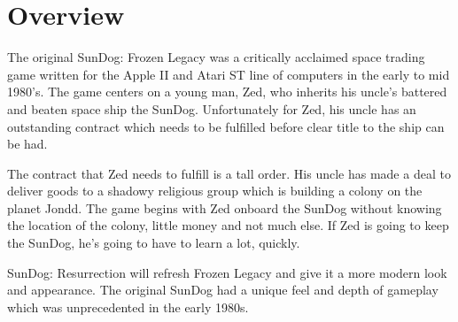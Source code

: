 \section{Overview}

The original SunDog: Frozen Legacy was a critically acclaimed space trading
game written for the Apple II and Atari ST line of computers in the early
to mid 1980's.  The game centers on a young man, Zed, who inherits his
uncle's battered and beaten space ship the SunDog.  Unfortunately for Zed, his
uncle has an outstanding contract which needs to be fulfilled before clear
title to the ship can be had.

The contract that Zed needs to fulfill is a tall order.  His uncle has made a
deal to deliver goods to a shadowy religious group which is building a
colony on the planet Jondd.  The game begins with Zed onboard the
SunDog without knowing the location of the colony, little money and not
much else.  If Zed is going to keep the SunDog, he's going to have to learn
a lot, quickly.

SunDog: Resurrection will refresh Frozen Legacy and give it a more modern
look and appearance.  The original SunDog had a unique feel and depth of
gameplay which was unprecedented in the early 1980s.

